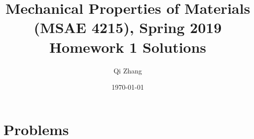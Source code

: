 \documentclass[12pt]{article}
\begin{document}

\title{Mechanical Properties of Materials (MSAE 4215), Spring 2019\\ Homework 1 Solutions}
\author{Qi Zhang}
\date{\today}

\maketitle

\tableofcontents
\listoffigures
\listoftables

\section{Problems}
\end{document}
